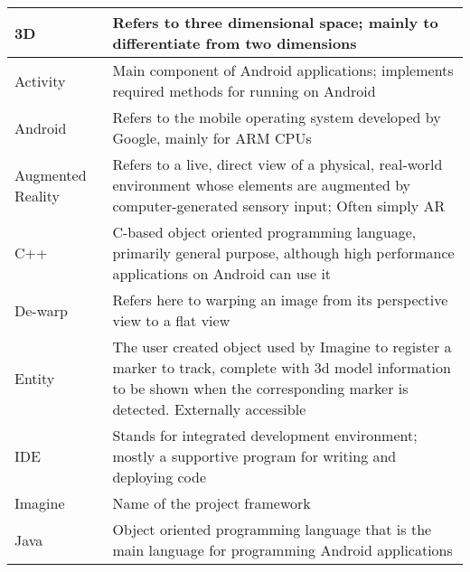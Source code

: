 
\begin{tabulary}{\textwidth}{L|L}
3D                & Refers to three dimensional space; mainly to differentiate from two dimensions                                                                                                         \\ \hline
    Activity          & Main component of Android applications; implements required methods for running on Android                                                                                             \\ \hline
    Android           & Refers to the mobile operating system developed by Google, mainly for ARM CPUs                                                                                                         \\ \hline
    Augmented Reality & Refers to a live, direct view of a physical, real-world environment whose elements are augmented by computer-generated sensory input\protect \cite{ardef}; Often simply AR             \\ \hline
    C++               & C-based object oriented programming language, primarily general purpose, although high performance applications on Android can use it                                                  \\ \hline
    De-warp           & Refers here to warping an image from its perspective view to a flat view                                                                                                               \\ \hline
    Entity            & The user created object used by Imagine to register a marker to track, complete with 3d model information to be shown when the corresponding marker is detected. Externally accessible \\ \hline
    IDE               & Stands for integrated development environment; mostly a supportive program for writing and deploying code                                                                              \\ \hline
    Imagine           & Name of the project framework                                                                                                                                                          \\ \hline
    Java              & Object oriented programming language that is the main language for programming Android applications                                                                                    \\ \hline

\end{tabulary}
